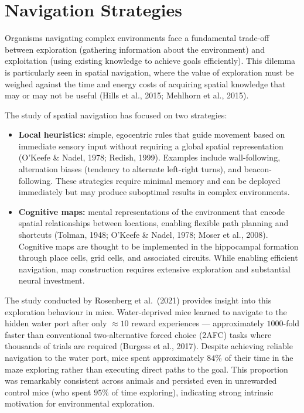 \section{Navigation Strategies}

Organisms navigating complex environments face a fundamental trade-off between exploration (gathering information about the environment) and exploitation (using existing knowledge to achieve goals efficiently). This dilemma is particularly seen in spatial navigation, where the value of exploration must be weighed against the time and energy costs of acquiring spatial knowledge that may or may not be useful (Hills et al., 2015; Mehlhorn et al., 2015).

The study of spatial navigation has focused on two strategies:

\begin{itemize}
\item \textbf{Local heuristics:} simple, egocentric rules that guide movement based on immediate sensory input without requiring a global spatial representation (O'Keefe \& Nadel, 1978; Redish, 1999). Examples include wall-following, alternation biases (tendency to alternate left-right turns), and beacon-following. These strategies require minimal memory and can be deployed immediately but may produce suboptimal results in complex environments.

\item \textbf{Cognitive maps:} mental representations of the environment that encode spatial relationships between locations, enabling flexible path planning and shortcuts (Tolman, 1948; O'Keefe \& Nadel, 1978; Moser et al., 2008). Cognitive maps are thought to be implemented in the hippocampal formation through place cells, grid cells, and associated circuits. While enabling efficient navigation, map construction requires extensive exploration and substantial neural investment.
\end{itemize}

The study conducted by Rosenberg et al.\ (2021) provides insight into this exploration behaviour in mice. Water-deprived mice learned to navigate to the hidden water port after only $\approx 10$ reward experiences --- approximately $1000$-fold faster than conventional two-alternative forced choice (2AFC) tasks where thousands of trials are required (Burgess et al., 2017). Despite achieving reliable navigation to the water port, mice spent approximately $84\%$ of their time in the maze exploring rather than executing direct paths to the goal. This proportion was remarkably consistent across animals and persisted even in unrewarded control mice (who spent $95\%$ of time exploring), indicating strong intrinsic motivation for environmental exploration.


